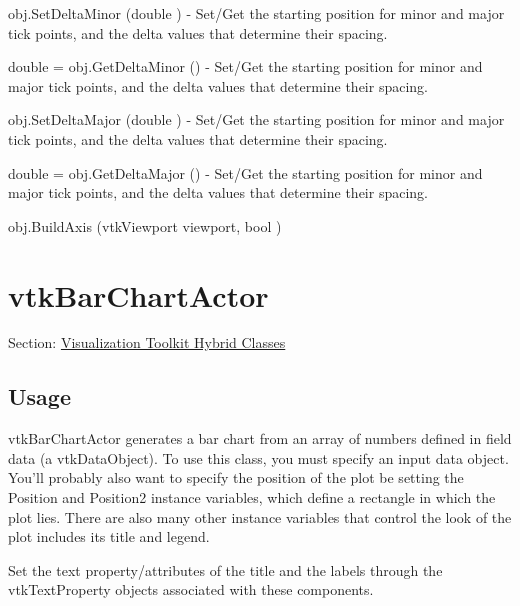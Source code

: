 \begin{DoxyItemize}
\item {\ttfamily obj.\-Set\-Delta\-Minor (double )} -\/ Set/\-Get the starting position for minor and major tick points, and the delta values that determine their spacing.  
\item {\ttfamily double = obj.\-Get\-Delta\-Minor ()} -\/ Set/\-Get the starting position for minor and major tick points, and the delta values that determine their spacing.  
\item {\ttfamily obj.\-Set\-Delta\-Major (double )} -\/ Set/\-Get the starting position for minor and major tick points, and the delta values that determine their spacing.  
\item {\ttfamily double = obj.\-Get\-Delta\-Major ()} -\/ Set/\-Get the starting position for minor and major tick points, and the delta values that determine their spacing.  
\item {\ttfamily obj.\-Build\-Axis (vtk\-Viewport viewport, bool )}  
\end{DoxyItemize}\hypertarget{vtkhybrid_vtkbarchartactor}{}\section{vtk\-Bar\-Chart\-Actor}\label{vtkhybrid_vtkbarchartactor}
Section\-: \hyperlink{sec_vtkhybrid}{Visualization Toolkit Hybrid Classes} \hypertarget{vtkwidgets_vtkxyplotwidget_Usage}{}\subsection{Usage}\label{vtkwidgets_vtkxyplotwidget_Usage}
vtk\-Bar\-Chart\-Actor generates a bar chart from an array of numbers defined in field data (a vtk\-Data\-Object). To use this class, you must specify an input data object. You'll probably also want to specify the position of the plot be setting the Position and Position2 instance variables, which define a rectangle in which the plot lies. There are also many other instance variables that control the look of the plot includes its title and legend.

Set the text property/attributes of the title and the labels through the vtk\-Text\-Property objects associated with these components.

